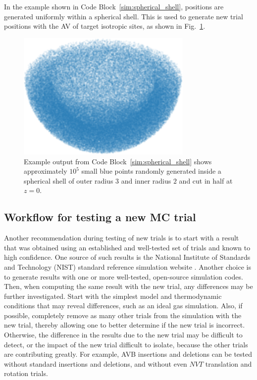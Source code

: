 \documentclass[
  9pt,
  bestpractices,
]{livecoms}
\begin{document}
In the example shown in Code Block~\ref{sim:spherical_shell}, positions are generated uniformly within a spherical shell.
This is used to generate new trial positions with the AV of target isotropic sites, as shown in Fig.~\ref{fig:spherical_shell}.

\begin{figure}

\end{figure}

\begin{figure}
\begin{centering}
\includegraphics[width=8.5cm]{../figures/spherical_shell.png}
\caption{
Example output from Code Block~\ref{sim:spherical_shell} shows approximately $10^5$ small blue points randomly generated inside a spherical shell of outer radius $3$ and inner radius $2$ and cut in half at $z=0$.
\label{fig:spherical_shell}
}
\end{centering}
\end{figure}

\subsection{\label{sec:testingnewtrial}Workflow for testing a new MC trial}

Another recommendation during testing of new trials is to start with a result that was obtained using an established and well-tested set of trials and known to high confidence.
One source of such results is the National Institute of Standards and Technology (NIST) standard reference simulation website \cite{shen_nist_2017}.
Another choice is to generate results with one or more well-tested, open-source simulation codes.
Then, when computing the same result with the new trial, any differences may be further investigated.
Start with the simplest model and thermodynamic conditions that may reveal differences, such as an ideal gas simulation.
Also, if possible, completely remove as many other trials from the simulation with the new trial, thereby allowing one to better determine if the new trial is incorrect.
Otherwise, the difference in the results due to the new trial may be difficult to detect, or the impact of the new trial difficult to isolate, because the other trials are contributing greatly.
For example, AVB insertions and deletions can be tested without standard insertions and deletions, and without even $NVT$ translation and rotation trials.
\end{document}
